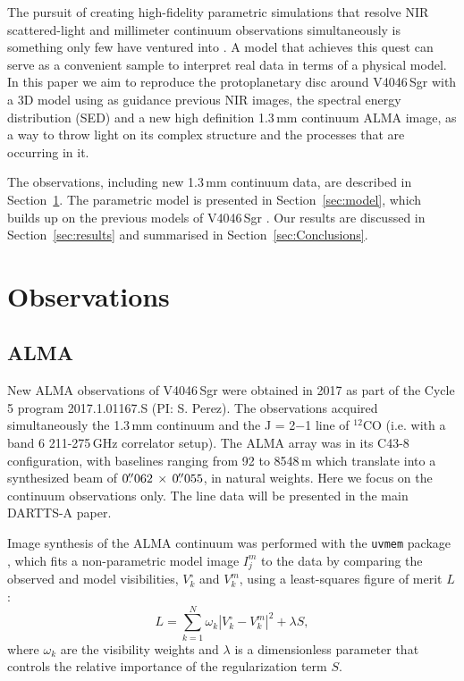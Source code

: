 \documentclass[fleqn,usenatbib,useAMS]{mnras}
\begin{document}
The pursuit of creating high-fidelity parametric simulations that resolve NIR scattered-light and millimeter continuum observations simultaneously is something only few have ventured into \citep[e.g.][]{Dong_2018,2019MNRAS.486..304B, Ru_z_Rodr_guez_2019}. A model that achieves this quest can serve as a convenient sample to interpret real data in terms of a physical model. In this paper we aim to reproduce the protoplanetary disc around V4046\,Sgr with a 3D model using as guidance previous NIR images, the spectral energy distribution (SED) and a new high definition 1.3\,mm continuum ALMA image, as a way to throw light on its complex structure and the processes that are occurring in it.

The observations, including new 1.3\,mm continuum data, are described in Section~\ref{sec:Observations}. The parametric model is presented in Section~\ref{sec:model}, which builds up on the previous models of V4046\,Sgr  \citep{Rosenfeld_2013, Ru_z_Rodr_guez_2019, 2019ApJ...882..160Q}. Our results are discussed in Section~\ref{sec:results} and summarised in Section~\ref{sec:Conclusions}.

\section{Observations} \label{sec:Observations}
\subsection{ALMA}

New ALMA observations of V4046\,Sgr were obtained in 2017 as part of the Cycle 5 program 2017.1.01167.S (PI: S. Perez). The observations acquired simultaneously the 1.3\,mm continuum and the J = 2$-$1 line of $^{12}$CO (i.e. with a band 6 211-275\,GHz correlator setup). The ALMA array was in its C43-8 configuration, with baselines ranging from 92 to 8548\,m which translate into a synthesized beam of $0\hbox{$.\!\!^{\prime\prime}$}062 \,\times \, 0\hbox{$.\!\!^{\prime\prime}$}055$, in  natural weights. Here we focus on the continuum observations only. The line data will be presented in the main DARTTS-A paper. 

Image synthesis of the ALMA continuum was performed with  the {\tt uvmem} package \citep{2006ApJ...639..951C, 2018A&C....22...16C}, which fits a non-parametric model image $I^m_j$ to the data by comparing the observed  and model visibilities, $V^\circ_k$ and $V^m_k$, using a least-squares figure of merit $L$:
\begin{equation}
  L = \sum_{k=1}^N \omega_k  |V^\circ_k - V^m_k|^2 + \lambda S,
\end{equation}
where $\omega_k$ are the visibility weights and $\lambda$ is a dimensionless parameter that controls the relative importance of the regularization term $S$.
\end{document}
